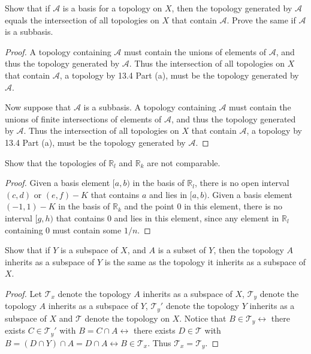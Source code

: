 \documentclass[12pt]{article}
\newenvironment{problem}[2][Problem]
{
	\begin{trivlist} 
		\item[\hskip \labelsep {\bfseries #1 #2:}]
	}
{
	\end{trivlist}
	}
\begin{document}
\begin{problem}{13.5}
Show that if $\mathcal{A}$ is a basis for a topology on $X$, then the topology generated by $\mathcal{A}$ equals the intersection of all topologies on $X$ that contain $\mathcal{A}$. Prove the same if $\mathcal{A}$ is a subbasis.
\end{problem}

\begin{proof}
A topology containing $\mathcal{A}$ must contain the unions of elements of $\mathcal{A}$, and thus the topology generated by $\mathcal{A}$. Thus the intersection of all topologies on $X$ that contain $\mathcal{A}$, a topology by 13.4 Part (a), must be the topology generated by $\mathcal{A}$. 

Now suppose that $\mathcal{A}$ is a subbasis. A topology containing $\mathcal{A}$ must contain the unions of finite intersections of elements of $\mathcal{A}$, and thus the topology generated by $\mathcal{A}$. Thus the intersection of all topologies on $X$ that contain $\mathcal{A}$, a topology by 13.4 Part (a), must be the topology generated by $\mathcal{A}$. 
\end{proof}

\begin{problem}{13.6}
Show that the topologies of $\mathbb{R}_l$ and $\mathbb{R}_k$ are not comparable.
\end{problem}

\begin{proof}
Given a basis element $[a, b)$ in the basis of $\mathbb{R}_l$, there is no open interval $(c, d)$ or $(e, f) - K$ that contains $a$ and lies in $[a, b)$. Given a basis element $(-1, 1) - K$ in the basis of $\mathbb{R}_k$ and the point $0$ in this element, there is no interval $[g, h)$ that contains $0$ and lies in this element, since any element in $\mathbb{R}_l$ containing $0$ must contain some $1/n$.
\end{proof}

\newpage
\begin{problem}{16.1}
Show that if $Y$ is a subspace of $X$, and $A$ is a subset of $Y$, then the topology $A$ inherits as a subspace of $Y$ is the same as the topology it inherits as a subspace of $X$.
\end{problem}
\begin{proof}
Let $\mathcal{T}_x$ denote the topology $A$ inherits as a subspace of $X$, $\mathcal{T}_y$ denote the topology $A$ inherits as a subspace of $Y$, $\mathcal{T}_y'$ denote the topology $Y$ inherits as a subspace of $X$ and $\mathcal{T}$ denote the topology on $X$. Notice that $B \in \mathcal{T}_y \leftrightarrow$ there exists $C \in \mathcal{T}_y'$ with $B = C \cap A \leftrightarrow$ there exists $D \in \mathcal{T}$ with $B = (D \cap Y) \cap A = D \cap A\leftrightarrow B \in \mathcal{T}_x$. Thus $\mathcal{T}_x = \mathcal{T}_y$.
\end{proof}
\end{document}
